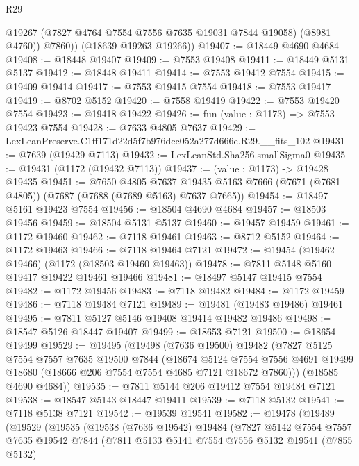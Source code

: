 \begin{lexlean}{R29}
\begin{coremodule}
            @19267
            (@7827 @4764 @7554 @7556 @7635 @19031 @7844 @19058)
            (@8981 @4760))
          @7860))
      (@18639 @19263 @19266))
@19407 := @18449 @4690 @4684
@19408 := @18448 @19407
@19409 := @7553 @19408
@19411 := @18449 @5131 @5137
@19412 := @18448 @19411
@19414 := @7553 @19412 @7554
@19415 := @19409 @19414
@19417 := @7553 @19415 @7554
@19418 := @7553 @19417
@19419 := @8702 @5152
@19420 := @7558 @19419
@19422 := @7553 @19420 @7554
@19423 := @19418 @19422
@19426 := fun (value : @1173) => @7553 @19423 @7554
@19428 := @7633 @4805 @7637
@19429 := LexLeanPreserve.C1ff171d22d5f7b976dcc052a277d666e.R29.__fits_102
@19431 := @7639 (@19429 @7113)
@19432 := LexLeanStd.Sha256.smallSigma0
@19435 := @19431 (@1172 (@19432 @7113))
@19437 := (value : @1173) -> @19428 @19435
@19451 := @7650
    @4805
    @7637
    @19435
    @5163
    @7666
    (@7671 (@7681 @4805))
    (@7687 (@7688 (@7689 @5163) @7637 @7665))
@19454 := @18497 @5161 @19423 @7554
@19456 := @18504 @4690 @4684
@19457 := @18503 @19456
@19459 := @18504 @5131 @5137
@19460 := @19457 @19459
@19461 := @1172 @19460
@19462 := @7118 @19461
@19463 := @8712 @5152
@19464 := @1172 @19463
@19466 := @7118 @19464 @7121
@19472 := @19454 (@19462 @19466) (@1172 (@18503 @19460 @19463))
@19478 := @7811 @5148 @5160 @19417 @19422 @19461 @19466
@19481 := @18497 @5147 @19415 @7554
@19482 := @1172 @19456
@19483 := @7118 @19482
@19484 := @1172 @19459
@19486 := @7118 @19484 @7121
@19489 := @19481 (@19483 @19486) @19461
@19495 := @7811 @5127 @5146 @19408 @19414 @19482 @19486
@19498 := @18547 @5126 @18447 @19407
@19499 := @18653 @7121
@19500 := @18654 @19499
@19529 := @19495
    (@19498
      (@7636 @19500)
      @19482
      (@7827
        @5125
        @7554
        @7557
        @7635
        @19500
        @7844
        (@18674
          @5124
          @7554
          @7556
          @4691
          @19499
          @18680
          (@18666 @206 @7554 @7554 @4685 @7121 @18672 @7860)))
      (@18585 @4690 @4684))
@19535 := @7811 @5144 @206 @19412 @7554 @19484 @7121
@19538 := @18547 @5143 @18447 @19411
@19539 := @7118 @5132
@19541 := @7118 @5138 @7121
@19542 := @19539 @19541
@19582 := @19478
    (@19489
      (@19529
        (@19535
          (@19538
            (@7636 @19542)
            @19484
            (@7827
              @5142
              @7554
              @7557
              @7635
              @19542
              @7844
              (@7811
                @5133
                @5141
                @7554
                @7556
                @5132
                @19541
                (@7855 @5132)

\end{coremodule}
\end{lexlean}
